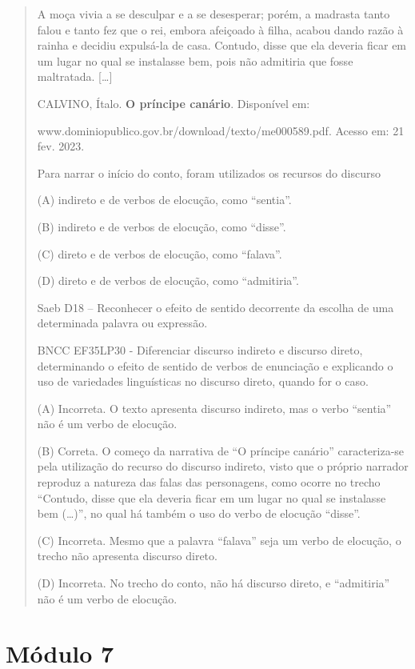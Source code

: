 \begin{quote}
A moça vivia a se desculpar e a se desesperar; porém, a madrasta tanto
falou e tanto fez que o rei, embora afeiçoado à filha, acabou dando
razão à rainha e decidiu expulsá-la de casa. Contudo, disse que ela
deveria ficar em um lugar no qual se instalasse bem, pois não admitiria
que fosse maltratada. {[}\ldots{}{]}

CALVINO, Ítalo. \textbf{O príncipe canário}. Disponível em:

www.dominiopublico.gov.br/download/texto/me000589.pdf. Acesso em: 21
fev. 2023.

Para narrar o início do conto, foram utilizados os recursos do discurso

\protect\hypertarget{_Hlk127859316}{}{}(A) indireto e de verbos de
elocução, como ``sentia''.

(B) indireto e de verbos de elocução, como ``disse''.

(C) direto e de verbos de elocução, como ``falava''.

(D) direto e de verbos de elocução, como ``admitiria''.

Saeb D18 -- Reconhecer o efeito de sentido decorrente da escolha de uma
determinada palavra ou expressão.

BNCC EF35LP30 - Diferenciar discurso indireto e discurso direto,
determinando o efeito de sentido de verbos de enunciação e explicando o
uso de variedades linguísticas no discurso direto, quando for o caso.

(A) Incorreta. O texto apresenta discurso indireto, mas o verbo
``sentia'' não é um verbo de elocução.

(B) Correta. O começo da narrativa de ``O príncipe canário''
caracteriza-se pela utilização do recurso do discurso indireto, visto
que o próprio narrador reproduz a natureza das falas das personagens,
como ocorre no trecho ``Contudo, disse que ela deveria ficar em um lugar
no qual se instalasse bem (\ldots{})'', no qual há também o uso do verbo
de elocução ``disse''.

(C) Incorreta. Mesmo que a palavra ``falava'' seja um verbo de elocução,
o trecho não apresenta discurso direto.

(D) Incorreta. No trecho do conto, não há discurso direto, e
``admitiria'' não é um verbo de elocução.
\end{quote}

\section{Módulo 7}\label{muxf3dulo-7}

